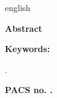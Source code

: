 \vspace{0.5\baselineskip}
\begin{otherlanguage*}{english}
		{\fontsize{11}{13}\selectfont 
		\textbf{Abstract}
		\vspace{-2mm}
		
		\AbstractArtigo
		\par}
		\vspace{0.1\baselineskip} \fontsize{11}{13}\selectfont 
		\textbf{Keywords: }{\fontsize{11}{13}\selectfont 
		\KeywordsArtigo.
		\par}
\end{otherlanguage*}		
		\vspace{0.1\baselineskip}
		{\fontsize{11}{13}\selectfont \bfseries
		\textbf{PACS no. }
		\PACSArtigo.
		\par}
\vspace{1\baselineskip}


